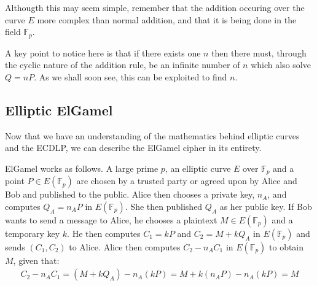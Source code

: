 \documentclass[12pt, a4paper, final]{report}
\begin{document}
Althougth this may seem simple, remember that the addition occuring over the
curve $E$ more complex than normal addition, and that it is being done in the
field $\mathds{F}_p$.

A key point to notice here is that if there exists one $n$ then there must,
through the cyclic nature of the addition rule, be an infinite number of
$n$ which also solve $Q = nP$. As we shall soon see, this can be exploited to
find $n$.


\subsection{Elliptic ElGamel}

Now that we have an understanding of the mathematics behind elliptic curves and
the ECDLP, we can describe the ElGamel cipher in its entirety.

ElGamel works as follows. A large prime $p$, an elliptic curve $E$ over
$\mathds{F}_p$ and a point $P \in E(\mathds{F}_p)$ are chosen by a trusted
party or agreed upon by Alice and Bob and published to the public. Alice then
chooses a private key, $n_A$, and computes $Q_A = n_AP$ in $E(\mathds{F}_p)$.
She then published $Q_A$ as her public key. If Bob wants to send a message to
Alice, he chooses a plaintext $M \in E(\mathds{F}_p)$ and a temporary key $k$.
He then computes $C_1 = kP$ and $C_2 = M + kQ_A$ in $E(\mathds{F}_p)$ and sends
$(C_1, C_2)$ to Alice. Alice then computes $C_2 - n_AC_1$ in $E(\mathds{F}_p)$
to obtain $M$, given that:
\begin{align*}
    C_2 - n_AC_1 = (M + kQ_A) - n_A(kP) = M + k(n_AP) - n_A(kP) = M
\end{align*}
\end{document}
